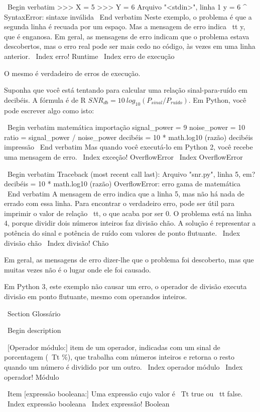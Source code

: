 \documentclass[10pt]{book}
\begin{document}
\begin {itemize}
{{{\ Begin {verbatim}
>>> X = 5
>>> Y = 6
  Arquivo "<stdin>", linha 1
    y = 6
    ^
SyntaxError: sintaxe inválida
\ End {verbatim}
%
Neste exemplo, o problema é que a segunda linha é recuada por
um espaço. Mas a mensagem de erro indica {\ tt y}, que é
enganosa. Em geral, as mensagens de erro indicam que o problema estava
descobertos, mas o erro real pode ser mais cedo no código,
às vezes em uma linha anterior.
\ Index {erro! Runtime}
\ Index {erro de execução}

O mesmo é verdadeiro de erros de execução.  

Suponha que você está tentando
para calcular uma relação sinal-para-ruído em decibéis. A fórmula
é de R $ SNR_ {db} = 10 \ log_ {10} (P_ {sinal} / P_ {ruído}) $. Em Python,
você pode escrever algo como isto:

\ Begin {verbatim}
matemática importação
signal_power = 9
noise_power = 10
ratio = signal_power / noise_power
decibéis = 10 * math.log10 (razão)
decibéis impressão
\ End {verbatim}
%
Mas quando você executá-lo em Python 2, você recebe uma mensagem de erro.
\ Index {exceção! OverflowError}
\ Index {} OverflowError

\ Begin {verbatim}
Traceback (most recent call last):
  Arquivo "snr.py", linha 5, em?
    decibéis = 10 * math.log10 (razão)
OverflowError: erro gama de matemática
\ End {verbatim}
%
A mensagem de erro indica que a linha 5, mas não há nada
de errado com essa linha. Para encontrar o verdadeiro erro, pode ser
útil para imprimir o valor de {relação \ tt}, o que acaba por
ser 0. O problema está na linha 4, porque dividir dois números inteiros
faz divisão chão. A solução é representar a potência do sinal
e potência de ruído com valores de ponto flutuante.
\ Index {divisão chão}
\ Index {divisão! Chão}

Em geral, as mensagens de erro dizer-lhe que o problema foi descoberto, 
mas que muitas vezes não é o lugar onde ele foi causado.

Em Python 3, este exemplo não causar um erro, o operador de divisão
executa divisão em ponto flutuante, mesmo com operandos inteiros.


\ Section {} Glossário

\ Begin {description}

\ [Operador módulo:] item de um operador, indicadas com um sinal de porcentagem
({\ Tt \%}), que trabalha com números inteiros e retorna o resto quando um
número é dividido por um outro.
\ Index {operador módulo}
\ Index {operador! Módulo}

\ Item [expressão booleana:] Uma expressão cujo valor é 
{\ Tt true} ou {\ tt false}.
\ Index {expressão booleana}
\ Index {expressão! Boolean}

}}}
\end{itemize}
\end{document}
